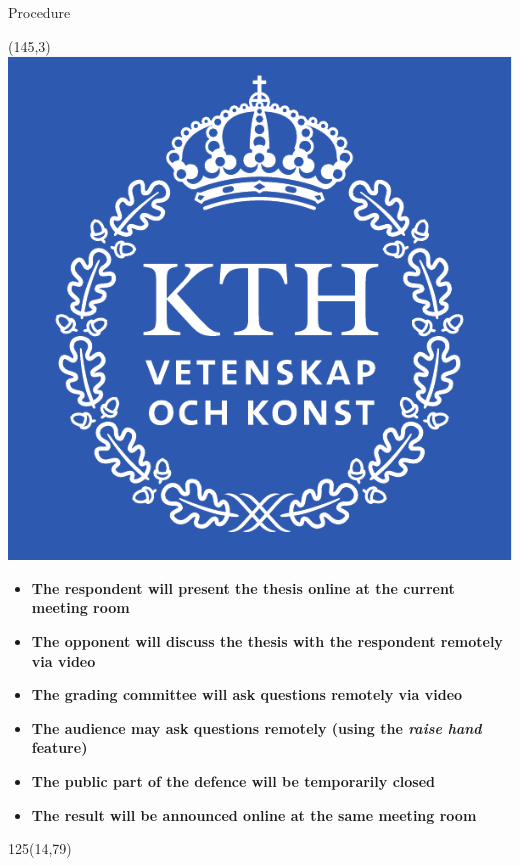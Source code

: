 \begin{frame}[plain]{Procedure}
  \protect\hypertarget{procedure}{}

  \begin{textblock}{12}(145,3)
    \includegraphics[width=\textwidth]{latex/kthgraphics/KTH-logo.pdf}
  \end{textblock}
  
  \begin{itemize}
  \item
    \textbf{The respondent will present the thesis online at the current meeting room}
    \medskip
  \item
    \textbf{The opponent will discuss the thesis with the respondent remotely via video}
    \medskip
  \item
    \textbf{The grading committee will ask questions remotely via video}
    \medskip
  \item
    \textbf{The audience may ask questions remotely (using the \emph{raise hand} feature)}
    \medskip
  \item
    \textbf{The public part of the defence will be temporarily closed}
    \medskip
  \item
    \textbf{The result will be announced online at the same meeting room}
  \end{itemize}

  \begin{textblock}{125}(14,79)
  \end{textblock}
  
\end{frame}
